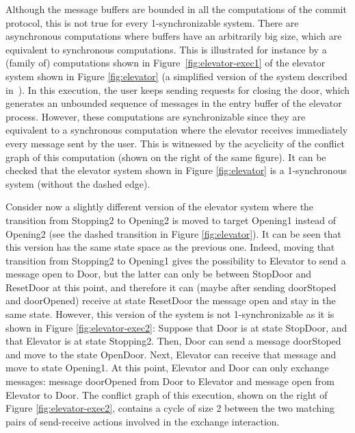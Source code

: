 Although the message buffers are bounded in all the computations of the commit protocol, this is not true for every 1-synchronizable system.
There are asynchronous computations where buffers have an arbitrarily big size, which are equivalent to synchronous computations. This is illustrated for instance by a (family of) computations shown in Figure~\ref{fig:elevator-exec1} of the elevator system shown in Figure \ref{fig:elevator} (a simplified version of the system described in~\cite{DBLP:conf/pldi/DesaiGJQRZ13}).  In this execution, the user keeps sending requests for closing the door, which generates an unbounded sequence of messages in the entry buffer of the elevator process. However, these computations are synchronizable since they are equivalent to a synchronous computation where the elevator receives immediately every message sent by the user. This is witnessed by the acyclicity of the conflict graph of this computation (shown on the right of the same figure). It can be checked that the elevator system shown in Figure \ref{fig:elevator} is a 1-synchronous system (without the dashed edge). 

Consider now a slightly different version of the elevator system where the transition from {\sf Stopping2} to {\sf Opening2} is moved to target {\sf Opening1} instead of {\sf Opening2} (see the dashed transition in Figure \ref{fig:elevator}). It can be seen that this version has the same state space as the previous one. Indeed, moving that transition from {\sf Stopping2} to {\sf Opening1} gives the possibility to {\sf Elevator} to send a message open to {\sf Door}, but the latter can only be between {\sf StopDoor} and {\sf ResetDoor} at this point, and therefore it can (maybe after sending {\sf doorStoped} and {\sf doorOpened}) receive at state {\sf ResetDoor} the message {\sf open} and stay in the same state. However, this version of the system is not 1-synchronizable as it is shown in Figure \ref{fig:elevator-exec2}: Suppose that {\sf Door} is at state {\sf StopDoor}, and that {\sf Elevator} is at state {\sf Stopping2}. Then, {\sf Door} can send a message {\sf doorStoped} and move to the state {\sf OpenDoor}. Next, {\sf Elevator} can receive that message and move to state {\sf Opening1}. At this point, {\sf Elevator} and {\sf Door} can only exchange messages: message {\sf doorOpened} from {\sf Door} to {\sf Elevator} and message {\sf open} from {\sf Elevator} to {\sf Door}. The conflict graph of this execution, shown on the right of Figure \ref{fig:elevator-exec2}, contains a cycle of size 2 between the two matching pairs of send-receive actions involved in the exchange interaction. 

